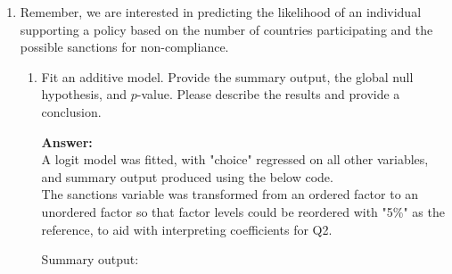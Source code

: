 \documentclass[12pt,letterpaper]{article}
\begin{document}
\begin{enumerate}
	\item
	Remember, we are interested in predicting the likelihood of an individual supporting a policy based on the number of countries participating and the possible sanctions for non-compliance.
	\begin{enumerate}
		\item [] Fit an additive model. Provide the summary output, the global null hypothesis, and $p$-value. Please describe the results and provide a conclusion.
		
		\vspace{.5cm}
		\textbf{Answer:}\\
		
		A logit model was fitted, with "choice" regressed on all other variables, and summary output produced using the below code.\\ 
		
		The sanctions variable was transformed from an ordered factor to an unordered factor so that factor levels could be reordered with "5\%" as the reference, to aid with interpreting coefficients for Q2.   
		
		\vspace{.5cm}
		  
		\vspace{.5cm} 
		
		Summary output:\\
		

\end{enumerate}
\end{enumerate}
\end{document}
